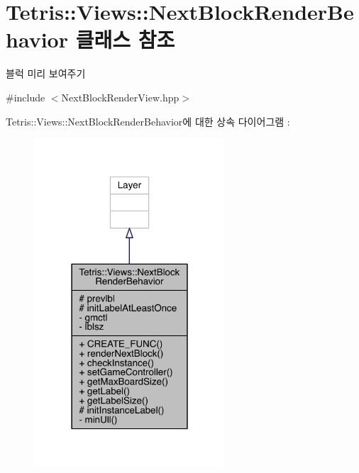 \hypertarget{class_tetris_1_1_views_1_1_next_block_render_behavior}{}\section{Tetris\+:\+:Views\+:\+:Next\+Block\+Render\+Behavior 클래스 참조}
\label{class_tetris_1_1_views_1_1_next_block_render_behavior}


블럭 미리 보여주기  




{\ttfamily \#include $<$Next\+Block\+Render\+View.\+hpp$>$}



Tetris\+:\+:Views\+:\+:Next\+Block\+Render\+Behavior에 대한 상속 다이어그램 \+: 
\nopagebreak
\begin{figure}[H]
\begin{center}
\leavevmode
\includegraphics[width=202pt]{d2/dff/class_tetris_1_1_views_1_1_next_block_render_behavior__inherit__graph}
\end{center}
\end{figure}


